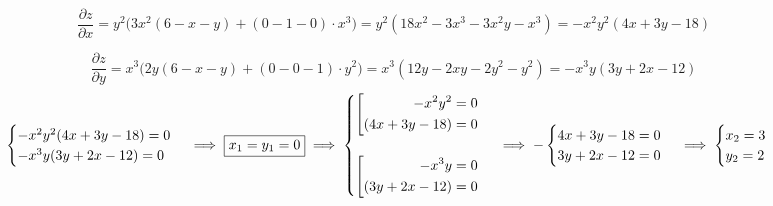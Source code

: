 \documentclass[../rgr1.tex]{subfiles}
\begin{document}
\Solution

\begin{dmath}
	\frac{\partial z}{\partial x}
	= y^2\Big(3x^2(6-x-y) + (0-1-0)\cdot x^3\Big)
	= y^2(18x^2 -3x^3 - 3x^2y -x^3)
	= -x^2y^2(4x+3y-18)
\end{dmath}

\begin{dmath}
	\frac{\partial z}{\partial y}
	= x^3 \Big( 2y(6-x-y) + (0-0-1)\cdot y^2 \Big)
	= x^3 (12y-2xy-2y^2-y^2)
	= -x^3y(3y+2x-12)
\end{dmath}
\begin{dmath}
	\begin{cases}
		-x^2y^2(4x+3y-18) = 0 \\
		-x^3y(3y+2x-12) = 0
	\end{cases} \implies
	\fbox{$x_1=y_1=0$} \implies
	\begin{cases}
		\left[
		\begin{aligned}
			-x^2y^2 = 0 \\
			(4x+3y-18) = 0
		\end{aligned} \right. \\
\\
		\left[
		\begin{aligned}
			-x^3y = 0 \\
			(3y+2x-12) = 0
		\end{aligned} \right. \\
	\end{cases} \implies
	-\begin{cases}
		4x+3y-18 = 0 \\
		3y+2x-12 = 0
	\end{cases} \implies
	\begin{cases}
		x_2=3 \\
		y_2=2
	\end{cases}
\end{dmath}
\end{document}
